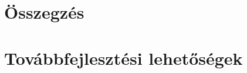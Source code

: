 \chapter{Összegzés}
\label{ch:sum}
\mbox{}


\chapter{Továbbfejlesztési lehetőségek}
\label{ch:future}
\mbox{}

